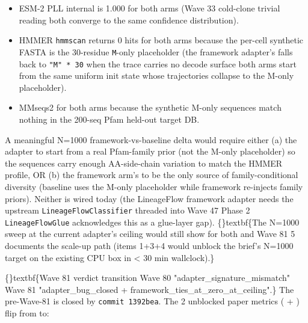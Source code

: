 \documentclass{article}
\begin{document}
\begin{itemize}
\item ESM-2 PLL internal  is 1.000 for both arms (Wave 33 cold-clone trivial reading  both converge to the same confidence distribution).
\item HMMER \texttt{hmmscan} returns 0 hits for both arms because the per-cell synthetic FASTA is the 30-residue \texttt{M}-only placeholder (the framework adapter's  falls back to \texttt{"M" * 30} when the trace carries no decode surface  both arms start from the same uniform init state whose trajectories collapse to the M-only placeholder).
\item MMseqs2  for both arms because the synthetic M-only sequences match nothing in the 200-seq Pfam held-out target DB.
\end{itemize}
A meaningful N=1000 framework-vs-baseline delta would require either (a) the adapter to start from a real Pfam-family prior (not the M-only placeholder) so the sequences carry enough AA-side-chain variation to match the HMMER profile, OR (b) the framework arm's  to be the only source of family-conditional diversity (baseline uses the M-only placeholder while framework re-injects family priors). Neither is wired today (the LineageFlow framework adapter needs the upstream \texttt{LineageFlowClassifier} threaded into   Wave 47 Phase 2 \texttt{LineageFlowGlue} acknowledges this as a glue-layer gap). \{\}textbf\{The N=1000 sweep at the current adapter's  ceiling would still show  for both  and   Wave 81 5 documents the scale-up path (items 1+3+4 would unblock the brief's N=1000 target on the existing CPU box in < 30 min wallclock).\}

\{\}textbf\{Wave 81 verdict transition  Wave 80 "adapter\_signature\_mismatch"  Wave 81 "adapter\_bug\_closed + framework\_ties\_at\_zero\_at\_ceiling".\} The pre-Wave-81  is closed by \texttt{commit 1392bea}. The 2 unblocked paper metrics ( + ) flip from  to:
\end{document}
